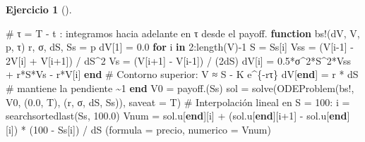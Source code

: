 \documentclass[
  spanish,
  a4paper,
]{scrreport}
\newenvironment{Shaded}{\begin{snugshade}}{\end{snugshade}}
\newcommand{\CommentTok}[1]{\textcolor[rgb]{0.37,0.37,0.37}{#1}}
\newcommand{\ControlFlowTok}[1]{\textcolor[rgb]{0.00,0.23,0.31}{\textbf{#1}}}
\newcommand{\FloatTok}[1]{\textcolor[rgb]{0.68,0.00,0.00}{#1}}
\newcommand{\FunctionTok}[1]{\textcolor[rgb]{0.28,0.35,0.67}{#1}}
\newcommand{\KeywordTok}[1]{\textcolor[rgb]{0.00,0.23,0.31}{\textbf{#1}}}
\newcommand{\NormalTok}[1]{\textcolor[rgb]{0.00,0.23,0.31}{#1}}
\newcommand{\OperatorTok}[1]{\textcolor[rgb]{0.37,0.37,0.37}{#1}}
\theoremstyle{definition}
\newtheorem{exercise}{Ejercicio}[chapter]
\theoremstyle{remark}
\begin{document}
\begin{exercise}[]
\begin{enumerate}
\begin{tcolorbox}
\begin{Shaded}
\begin{Highlighting}[]
\CommentTok{\# τ = T {-} t : integramos hacia adelante en τ desde el payoff.}
\KeywordTok{function} \FunctionTok{bs!}\NormalTok{(dV, V, p, τ)}
\NormalTok{    r, σ, dS, Ss }\OperatorTok{=}\NormalTok{ p}
\NormalTok{    dV[}\FloatTok{1}\NormalTok{] }\OperatorTok{=} \FloatTok{0.0}
    \ControlFlowTok{for}\NormalTok{ i }\KeywordTok{in} \FloatTok{2}\OperatorTok{:}\FunctionTok{length}\NormalTok{(V)}\OperatorTok{{-}}\FloatTok{1}
\NormalTok{        S }\OperatorTok{=}\NormalTok{ Ss[i]}
\NormalTok{        Vss }\OperatorTok{=}\NormalTok{ (V[i}\OperatorTok{{-}}\FloatTok{1}\NormalTok{] }\OperatorTok{{-}} \FloatTok{2}\NormalTok{V[i] }\OperatorTok{+}\NormalTok{ V[i}\OperatorTok{+}\FloatTok{1}\NormalTok{]) }\OperatorTok{/}\NormalTok{ dS}\OperatorTok{\^{}}\FloatTok{2}
\NormalTok{        Vs  }\OperatorTok{=}\NormalTok{ (V[i}\OperatorTok{+}\FloatTok{1}\NormalTok{] }\OperatorTok{{-}}\NormalTok{ V[i}\OperatorTok{{-}}\FloatTok{1}\NormalTok{]) }\OperatorTok{/}\NormalTok{ (}\FloatTok{2}\NormalTok{dS)}
\NormalTok{        dV[i] }\OperatorTok{=} \FloatTok{0.5}\OperatorTok{*}\NormalTok{σ}\OperatorTok{\^{}}\FloatTok{2}\OperatorTok{*}\NormalTok{S}\OperatorTok{\^{}}\FloatTok{2}\OperatorTok{*}\NormalTok{Vss }\OperatorTok{+}\NormalTok{ r}\OperatorTok{*}\NormalTok{S}\OperatorTok{*}\NormalTok{Vs }\OperatorTok{{-}}\NormalTok{ r}\OperatorTok{*}\NormalTok{V[i]}
    \ControlFlowTok{end}
    \CommentTok{\# Contorno superior: V ≈ S {-} K e\^{}\{{-}rτ\}}
\NormalTok{    dV[}\KeywordTok{end}\NormalTok{] }\OperatorTok{=}\NormalTok{ r }\OperatorTok{*}\NormalTok{ dS   }\CommentTok{\# mantiene la pendiente \textasciitilde{}1}
\KeywordTok{end}
\NormalTok{V0 }\OperatorTok{=} \FunctionTok{payoff}\NormalTok{.(Ss)}
\NormalTok{sol }\OperatorTok{=} \FunctionTok{solve}\NormalTok{(}\FunctionTok{ODEProblem}\NormalTok{(bs!, V0, (}\FloatTok{0.0}\NormalTok{, T), (r, σ, dS, Ss)), saveat }\OperatorTok{=}\NormalTok{ T)}
\CommentTok{\# Interpolación lineal en S = 100:}
\NormalTok{i }\OperatorTok{=} \FunctionTok{searchsortedlast}\NormalTok{(Ss, }\FloatTok{100.0}\NormalTok{)}
\NormalTok{Vnum }\OperatorTok{=}\NormalTok{ sol.u[}\KeywordTok{end}\NormalTok{][i] }\OperatorTok{+}\NormalTok{ (sol.u[}\KeywordTok{end}\NormalTok{][i}\OperatorTok{+}\FloatTok{1}\NormalTok{] }\OperatorTok{{-}}\NormalTok{ sol.u[}\KeywordTok{end}\NormalTok{][i]) }\OperatorTok{*}\NormalTok{ (}\FloatTok{100} \OperatorTok{{-}}\NormalTok{ Ss[i]) }\OperatorTok{/}\NormalTok{ dS}
\NormalTok{(formula }\OperatorTok{=}\NormalTok{ precio, numerico }\OperatorTok{=}\NormalTok{ Vnum)}
\end{Highlighting}
\end{Shaded}


\end{tcolorbox}
\end{enumerate}
\end{exercise}
\end{document}
